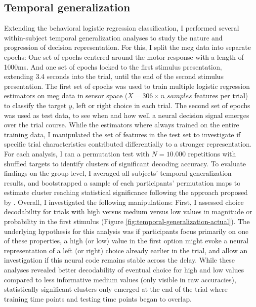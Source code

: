 \subsection{Temporal generalization}
\label{temporal-generalization-analysis}

Extending the behavioral logistic regression classification, I performed several within-subject temporal generalization analyses to study the nature and progression of decision representation.
For this, I split the \gls{meg} data into separate epochs:
One set of epochs centered around the motor response with a length of 1000ms.
And one set of epochs locked to the first stimulus presentation, extending 3.4 seconds into the trial, until the end of the second stimulus presentation.
The first set of epochs was used to train multiple logistic regression estimators on \gls{meg} data in sensor space ($X=306 \times n\_samples$ features per trial) to classify the target $y$, left or right choice in each trial.
The second set of epochs was used as test data, to see when and how well a neural decision signal emerges over the trial course.
While the estimators where always trained on the entire training data, I manipulated the set of features in the test set to investigate if specific trial characteristics contributed differentially to a stronger representation.
For each analysis, I ran a permutation test with $N=10.000$ repetitions with shuffled targets to identify clusters of significant decoding accuracy.
To evaluate findings on the group level, I averaged all subjects' temporal generalization results, and bootstrapped a sample of each participants' permutation maps to estimate cluster reaching statistical significance following the approach proposed by \citet{stelzer2013statistical}.
Overall, I investigated the following manipulations:
First, I assessed choice decodability for trials with high versus medium versus low values in magnitude or probability in the first stimulus (Figure \ref{fig:temporal-generalization-actual}).
The underlying hypothesis for this analysis was if participants focus primarily on one of these properties, a high (or low) value in the first option might evoke a neural representation of a left (or right) choice already earlier in the trial, and allow an investigation if this neural code remains stable across the delay.
While these analyses revealed better decodability of eventual choice for high and low values compared to less informative medium values (only visible in raw accuracies), statistically significant clusters only emerged at the end of the trial where training time points and testing time points began to overlap.\\
